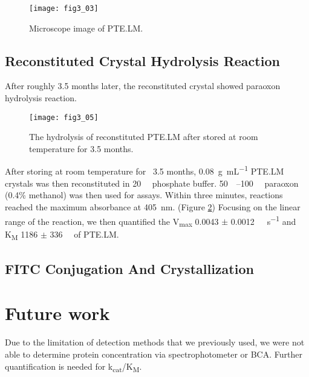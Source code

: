 \begin{refsection}
\begin{figure}[h!] \centering \texttt{[image: fig3\_03]} 
    \caption[Microscope image of PTE.LM.]{Microscope image of PTE.LM.} 
    \label{fig:ptelm-image} 
\end{figure}

\subsection{Reconstituted Crystal Hydrolysis Reaction}

After roughly 3.5 months later, the reconstituted crystal showed paraoxon
hydrolysis reaction.

\begin{figure}[h!] \centering \texttt{[image: fig3\_05]} 
    \caption[The hydrolysis of reconstituted PTE.LM after stored at room
    temperature for 3.5 months.]{The hydrolysis of reconstituted PTE.LM after
    stored at room temperature for 3.5 months.} \label{fig:ptelm-hydrolysis} 
\end{figure}

After storing at room temperature for ~3.5 months, \SI{0.08}{\gram\per\mL}
PTE.LM crystals was then reconstituted in \SI{20}{\milli\Molar} phosphate
buffer. \SIrange{50}{100}{\micro\Molar} paraoxon (0.4\% methanol) was then used
for assays. Within three minutes, reactions reached the maximum absorbance at
\SI{405}{\nm}. (Figure \ref{fig:ptelm-hydrolysis}) Focusing on the linear range
of the reaction, we then quantified the V\textsubscript{max} 0.0043 $\pm$
\SI{0.0012}{\micro\Molar\per\second} and K\textsubscript{M} 1186 $\pm$
\SI{336}{\micro\Molar} of PTE.LM. 

\subsection{FITC Conjugation And Crystallization}

\section{Future work}

Due to the limitation of detection methods that we previously used, we were not
able to determine protein concentration via spectrophotometer or BCA. Further
quantification is needed for k\textsubscript{cat}/K\textsubscript{M}.

\printbibliography[heading=subbibliography]

\end{refsection}
